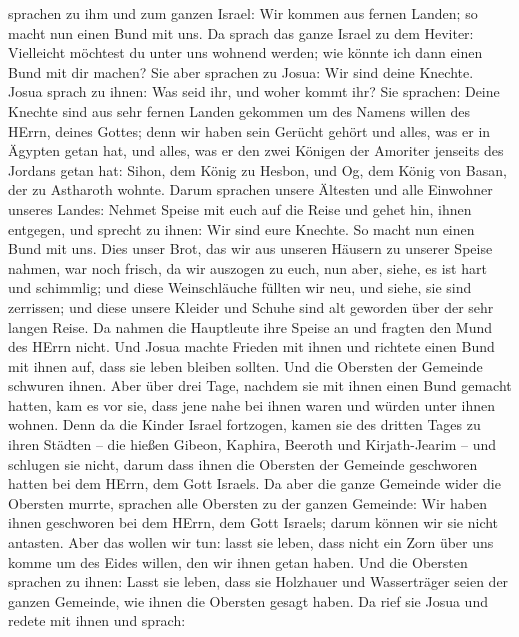 sprachen zu ihm und zum ganzen Israel: Wir kommen aus fernen Landen; so
macht nun einen Bund mit uns.  Da sprach das ganze Israel zu
dem Heviter: Vielleicht möchtest du unter uns wohnend werden; wie könnte
ich dann einen Bund mit dir machen?  Sie aber sprachen zu
Josua: Wir sind deine Knechte. Josua sprach zu ihnen: Was seid ihr, und
woher kommt ihr?  Sie sprachen: Deine Knechte sind aus sehr
fernen Landen gekommen um des Namens willen des HErrn, deines Gottes;
denn wir haben sein Gerücht gehört und alles, was er in Ägypten getan
hat,  und alles, was er den zwei Königen der Amoriter
jenseits des Jordans getan hat: Sihon, dem König zu Hesbon, und Og, dem
König von Basan, der zu Astharoth wohnte.  Darum sprachen
unsere Ältesten und alle Einwohner unseres Landes: Nehmet Speise mit
euch auf die Reise und gehet hin, ihnen entgegen, und sprecht zu ihnen:
Wir sind eure Knechte. So macht nun einen Bund mit uns. 
Dies unser Brot, das wir aus unseren Häusern zu unserer Speise nahmen,
war noch frisch, da wir auszogen zu euch, nun aber, siehe, es ist hart
und schimmlig;  und diese Weinschläuche füllten wir neu,
und siehe, sie sind zerrissen; und diese unsere Kleider und Schuhe sind
alt geworden über der sehr langen Reise.  Da nahmen die
Hauptleute ihre Speise an und fragten den Mund des HErrn nicht.
 Und Josua machte Frieden mit ihnen und richtete einen Bund
mit ihnen auf, dass sie leben bleiben sollten. Und die Obersten der
Gemeinde schwuren ihnen.  Aber über drei Tage, nachdem sie
mit ihnen einen Bund gemacht hatten, kam es vor sie, dass jene nahe bei
ihnen waren und würden unter ihnen wohnen.  Denn da die
Kinder Israel fortzogen, kamen sie des dritten Tages zu ihren Städten --
die hießen Gibeon, Kaphira, Beeroth und Kirjath-Jearim -- 
und schlugen sie nicht, darum dass ihnen die Obersten der Gemeinde
geschworen hatten bei dem HErrn, dem Gott Israels. Da aber die ganze
Gemeinde wider die Obersten murrte,  sprachen alle Obersten
zu der ganzen Gemeinde: Wir haben ihnen geschworen bei dem HErrn, dem
Gott Israels; darum können wir sie nicht antasten.  Aber
das wollen wir tun: lasst sie leben, dass nicht ein Zorn über uns komme
um des Eides willen, den wir ihnen getan haben.  Und die
Obersten sprachen zu ihnen: Lasst sie leben, dass sie Holzhauer und
Wasserträger seien der ganzen Gemeinde, wie ihnen die Obersten gesagt
haben.  Da rief sie Josua und redete mit ihnen und sprach:
